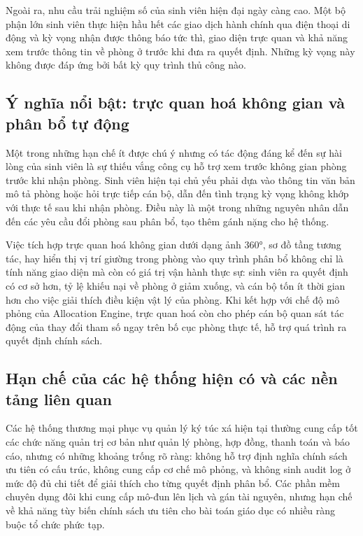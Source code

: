 ﻿\documentclass[a4paper,12pt,openany,oneside]{report}
\begin{document}
Ngoài ra, nhu cầu trải nghiệm số của sinh viên hiện đại ngày càng cao. Một bộ
phận lớn sinh viên thực hiện hầu hết các giao dịch hành chính qua điện thoại di
động và kỳ vọng nhận được thông báo tức thì, giao diện trực quan và khả năng
xem trước thông tin về phòng ở trước khi đưa ra quyết định. Những kỳ vọng này
không được đáp ứng bởi bất kỳ quy trình thủ công nào.

\subsection{Ý nghĩa nổi bật: trực quan hoá không gian và phân bổ tự động}

Một trong những hạn chế ít được chú ý nhưng có tác động đáng kể đến sự hài lòng
của sinh viên là sự thiếu vắng công cụ hỗ trợ xem trước không gian phòng trước
khi nhận phòng. Sinh viên hiện tại chủ yếu phải dựa vào thông tin văn bản mô tả
phòng hoặc hỏi trực tiếp cán bộ, dẫn đến tình trạng kỳ vọng không khớp với thực
tế sau khi nhận phòng. Điều này là một trong những nguyên nhân dẫn đến các yêu
cầu đổi phòng sau phân bổ, tạo thêm gánh nặng cho hệ thống.

Việc tích hợp trực quan hoá không gian dưới dạng ảnh 360°, sơ đồ tầng tương
tác, hay hiển thị vị trí giường trong phòng vào quy trình phân bổ không chỉ là
tính năng giao diện mà còn có giá trị vận hành thực sự: sinh viên ra quyết định
có cơ sở hơn, tỷ lệ khiếu nại về phòng ở giảm xuống, và cán bộ tốn ít thời gian
hơn cho việc giải thích điều kiện vật lý của phòng. Khi kết hợp với chế độ mô
phỏng của Allocation Engine, trực quan hoá còn cho phép cán bộ quan sát tác động
của thay đổi tham số ngay trên bố cục phòng thực tế, hỗ trợ quá trình ra quyết
định chính sách.

\subsection{Hạn chế của các hệ thống hiện có và các nền tảng liên quan}

Các hệ thống thương mại phục vụ quản lý ký túc xá hiện tại thường cung cấp tốt
các chức năng quản trị cơ bản như quản lý phòng, hợp đồng, thanh toán và báo
cáo, nhưng có những khoảng trống rõ ràng: không hỗ trợ định nghĩa chính sách ưu
tiên có cấu trúc, không cung cấp cơ chế mô phỏng, và không sinh audit log ở mức
độ đủ chi tiết để giải thích cho từng quyết định phân bổ. Các phần mềm chuyên
dụng đôi khi cung cấp mô-đun lên lịch và gán tài nguyên, nhưng hạn chế về khả
năng tùy biến chính sách ưu tiên cho bài toán giáo dục có nhiều ràng buộc tổ
chức phức tạp.
\end{document}
